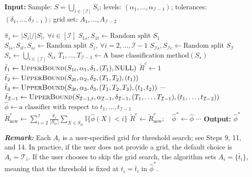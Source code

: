 \begin{algorithm}[h!]
\caption{\textsc{H--NP umbrella algorithm for } $\mathcal{I}$ classes}
\label{algorithm_2}
\textbf{Input:} Sample: $S=\bigcup_{i\in[\mathcal{I}]} S_i$; levels: $(\alpha_1,\ldots,\alpha_{\mathcal{I}-1})$;  tolerances: $(\delta_1,\ldots,\delta_{\mathcal{I}-1})$; grid set: $A_1,\ldots,A_{\mathcal{I}-2}$
\begin{algorithmic}[1]
\State $\hat{\pi}_i \gets |S_i|/|S|,\ \forall i\in[\mathcal{I}]$
\State $S_{1s},S_{1t} \gets \text{Random split } S_1$
\State $S_{is},S_{it},S_{ie} \gets \text{Random split } S_i,\ \forall i=2,\ldots,\mathcal{I}-1$
\State $S_{\mathcal{I}s},S_{\mathcal{I}e} \gets \text{Random split } S_{\mathcal{I}}$
\State $S_s \gets \bigcup_{i\in[\mathcal{I}]} S_{is}$
\State $T_1,\ldots,T_{\mathcal{I}-1} \gets \text{A base classification method}(S_s)$
\State $\bar{t}_1 \gets \textsc{UpperBound}(S_{1t},\alpha_1,\delta_1,(T_1),\text{NULL})$
\State $\tilde{R}^c \gets 1$
\For{$t_1 \in A_1 \cap (-\infty,\bar{t}_1]$}  
  \State $\bar{t}_2 \gets \textsc{UpperBound}(S_{2t},\alpha_2,\delta_2,(T_1,T_2),(t_1))$
  \For{$t_2 \in A_2 \cap (-\infty,\bar{t}_2]$}
    \State $\bar{t}_3 \gets \textsc{UpperBound}(S_{3t},\alpha_3,\delta_3,(T_1,T_2,T_3),(t_1,t_2))$
    \State $\cdots$
    \For{$t_{\mathcal{I}-2} \in A_{\mathcal{I}-2} \cap (-\infty,\bar{t}_{\mathcal{I}-2}]$}
      \State $\bar{t}_{\mathcal{I}-1} \gets \textsc{UpperBound}(S_{\mathcal{I}-1,t},\alpha_{\mathcal{I}-1},\delta_{\mathcal{I}-1},(T_1,\ldots,T_{\mathcal{I}-1}),(t_1,\ldots,t_{\mathcal{I}-2}))$
      \State $\hat{\phi} \gets \text{a classifier with respect to } t_1,\ldots,t_{\mathcal{I}-1}$
      \State $\tilde{R}^c_{\text{new}} \gets \sum_{i=2}^{\mathcal{I}} \frac{\hat{\pi}_i}{|S_{ie}|}\sum_{X\in S_{ie}} \mathbb{I}\{\hat{\phi}(X) < i\}$
        \State $\tilde{R}^c \gets \tilde{R}^c_{\text{new}};\quad \hat{\phi}^* \gets \hat{\phi}$
      \EndIf
    \EndFor
    \State $\cdots$
  \EndFor
\EndFor
\State \textbf{Output:} $\hat{\phi}^*$
\end{algorithmic}



\vspace{0.5em}
\noindent\textbf{\textit{Remark:}} Each \(A_i\) is a user-specified grid for threshold search; see Steps 9, 11, and 14. In practice, if the user does not provide a grid, the default choice is \(A_i=\mathcal{T}_i\). If the user chooses to skip the grid search, the algorithm sets \(A_i=\{\bar{t}_i\}\), meaning that the threshold is fixed at \(t_i = \bar{t}_i\) in \(\hat{\phi}^*\).
\end{algorithm}






